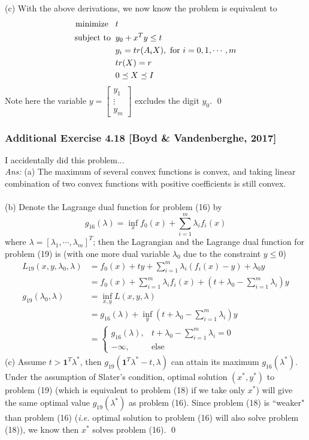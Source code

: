 \documentclass[12pt,a4paper]{article}
\renewcommand{\l}{\left}\renewcommand{\r}{\right}
\newcommand{\casebrak}[4]{\left \{ \begin{array}{ll} {#1},&{#2}\\{#3},&{#4} \end{array} \right.}
\newcommand{\SUM}[2]{\sum\limits_{#1}^{#2}}
\newcommand\ie{{\it i.e. }}
\begin{document}
(c) With the above derivations, we now know the problem is equivalent to
\begin{align*}
\mbox{minimize\;\;\;} & t\\
\mbox{subject to\;\;} & y_0 + x^Ty \leq t \\
& y_i = tr(A_i X), \mbox{ for }i = 0, 1, \cdots, m\\
& tr(X) = r \\
& 0 \preceq X \preceq I
\end{align*}
Note here the variable $y = \l[\begin{array}{c}
y_1\\
\vdots\\
y_m\end{array}\r]$ excludes the digit $y_0$. \qed




\newpage\subsubsection*{Additional Exercise 4.18 [Boyd \& Vandenberghe, 2017]}
I accidentally did this problem...\\
{\it Ans:} (a) The maximum of several convex functions is convex, and taking linear combination of two convex functions with positive coefficients is still convex. \\
\\
(b) Denote the Lagrange dual function for problem (16) by
$$g_{16}(\lambda) = \inf_x f_0(x) + \SUM{i=1}m \lambda_if_i(x)$$
where $\lambda = [\lambda_1, \cdots, \lambda_m]^T$; then the Lagrangian and the Lagrange dual function for problem (19) is (with one more dual variable $\lambda_0$ due to the constraint $y\leq 0$)
\begin{align*}
L_{19}(x, y, \lambda_0, \lambda) & = f_0(x) + ty + \SUM{i=1}m \lambda_i(f_i(x) - y) + \lambda_0 y \\
& = f_0(x) + \SUM{i=1}m \lambda_i f_i(x) + \l(t + \lambda_0 - \SUM{i=1}m \lambda_i\r)y \\
g_{19}(\lambda_0, \lambda) & = \inf_{x, y} L(x, y, \lambda) \\
&= g_{16}(\lambda) + \inf_y \l(t + \lambda_0 - \SUM{i=1}m \lambda_i\r)y \\
&= \casebrak{g_{16}(\lambda)}{t + \lambda_0 - \SUM{i=1}m \lambda_i = 0}{-\infty}{\mbox{else}}
\end{align*}
(c) Assume $t > \mathbf1^T\lambda^\ast$, then $g_{19}(\mathbf1^T\lambda^\ast - t, \lambda)$ can attain its maximum $g_{16}(\lambda^\ast)$. Under the assumption of Slater's condition, optimal solution $(x^\ast, y^\ast)$ to problem (19) (which is equivalent to problem (18) if we take only $x^\ast$) will give the same optimal value $g_{19}(\lambda^\ast)$ as problem (16). Since problem (18) is ``weaker" than problem (16) (\ie optimal solution to problem (16) will also solve problem (18)), we know then $x^\ast$ solves problem (16). \qed
\end{document}
